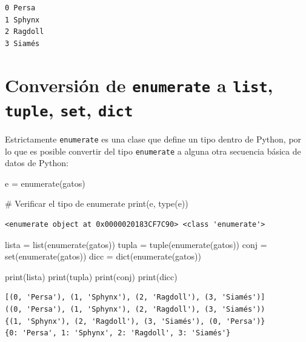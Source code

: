 \documentclass[
  spanish,
  letterpaper,
]{scrbook}
\newenvironment{Shaded}{\begin{snugshade}}{\end{snugshade}}
\newcommand{\BuiltInTok}[1]{\textcolor[rgb]{0.00,0.23,0.31}{#1}}
\newcommand{\CommentTok}[1]{\textcolor[rgb]{0.37,0.37,0.37}{#1}}
\newcommand{\NormalTok}[1]{\textcolor[rgb]{0.00,0.23,0.31}{#1}}
\newcommand{\OperatorTok}[1]{\textcolor[rgb]{0.37,0.37,0.37}{#1}}
\theoremstyle{definition}
\theoremstyle{remark}
\begin{document}
\begin{verbatim}
0 Persa
1 Sphynx
2 Ragdoll
3 Siamés
\end{verbatim}

\section{\texorpdfstring{Conversión de \texttt{enumerate} a
\texttt{list}, \texttt{tuple}, \texttt{set},
\texttt{dict}}{Conversión de enumerate a list, tuple, set, dict}}\label{conversiuxf3n-de-enumerate-a-list-tuple-set-dict}

Estrictamente \texttt{enumerate} es una clase que define un tipo dentro
de Python, por lo que es posible convertir del tipo \texttt{enumerate} a
alguna otra secuencia básica de datos de Python:

\begin{Shaded}
\begin{Highlighting}[]
\NormalTok{e }\OperatorTok{=} \BuiltInTok{enumerate}\NormalTok{(gatos)}

\CommentTok{\# Verificar el tipo de enumerate}
\BuiltInTok{print}\NormalTok{(e, }\BuiltInTok{type}\NormalTok{(e))}
\end{Highlighting}
\end{Shaded}

\begin{verbatim}
<enumerate object at 0x0000020183CF7C90> <class 'enumerate'>
\end{verbatim}

\begin{Shaded}
\begin{Highlighting}[]
\NormalTok{lista }\OperatorTok{=} \BuiltInTok{list}\NormalTok{(}\BuiltInTok{enumerate}\NormalTok{(gatos))}
\NormalTok{tupla }\OperatorTok{=} \BuiltInTok{tuple}\NormalTok{(}\BuiltInTok{enumerate}\NormalTok{(gatos))}
\NormalTok{conj }\OperatorTok{=} \BuiltInTok{set}\NormalTok{(}\BuiltInTok{enumerate}\NormalTok{(gatos))}
\NormalTok{dicc }\OperatorTok{=} \BuiltInTok{dict}\NormalTok{(}\BuiltInTok{enumerate}\NormalTok{(gatos))}

\BuiltInTok{print}\NormalTok{(lista)}
\BuiltInTok{print}\NormalTok{(tupla)}
\BuiltInTok{print}\NormalTok{(conj)}
\BuiltInTok{print}\NormalTok{(dicc)}
\end{Highlighting}
\end{Shaded}

\begin{verbatim}
[(0, 'Persa'), (1, 'Sphynx'), (2, 'Ragdoll'), (3, 'Siamés')]
((0, 'Persa'), (1, 'Sphynx'), (2, 'Ragdoll'), (3, 'Siamés'))
{(1, 'Sphynx'), (2, 'Ragdoll'), (3, 'Siamés'), (0, 'Persa')}
{0: 'Persa', 1: 'Sphynx', 2: 'Ragdoll', 3: 'Siamés'}
\end{verbatim}
\end{document}
